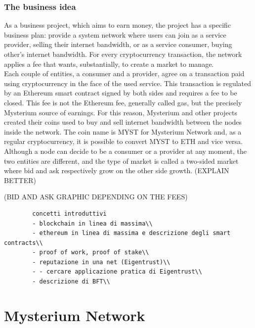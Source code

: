 \documentclass[12pt]{article}
\begin{document}
	\subsubsection{The business idea}
	As a business project, which aims to earn money, the project has a specific business plan: provide a system network where users can join as a service provider, selling their internet bandwidth, or as a service consumer, buying other's internet bandwidth. For every cryptocurrency transaction, the network applies a fee that wants, substantially, to create a market to manage.\\
	Each couple of entities, a consumer and a provider, agree on a transaction paid using cryptocurrency in the face of the used service. This transaction is regulated by an Ethereum smart contract signed by both sides and requires a fee to be closed. This fee is not the Ethereum fee, generally called gas, but the precisely Mysterium source of earnings. For this reason, Mysterium and other projects created their coins used to buy and sell internet bandwidth between the nodes inside the network. The coin name is MYST for Mysterium Network and, as a regular cryptocurrency, it is possible to convert MYST to ETH and vice versa.\\
	Although a node can decide to be a consumer or a provider at any moment, the two entities are different, and the type of market is called a two-sided market where bid and ask respectively grow on the other side growth. (EXPLAIN BETTER)\\
	\bigbreak

	(BID AND ASK GRAPHIC DEPENDING ON THE FEES)

	\begin{verbatim}
		concetti introduttivi
		- blockchain in linea di massima\\
		- ethereum in linea di massima e descrizione degli smart contracts\\
		- proof of work, proof of stake\\
		- reputazione in una net (Eigentrust)\\
		- - cercare applicazione pratica di Eigentrust\\
		- descrizione di BFT\\
	\end{verbatim}
	\bigbreak
	
	\section{Mysterium Network}
	
\end{document}
